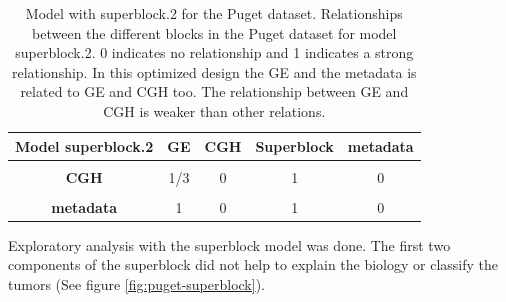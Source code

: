 \documentclass[
  12pt,
  a4paper,
  twoside,
  openright]{book}
\begin{document}
\begin{table}[H]

\caption[Model with superblock.2 for the Puget dataset.]{\label{tab:puget-model-superblock-2}Model with superblock.2 for the Puget dataset. Relationships between the different blocks in the Puget dataset for model superblock.2. 0 indicates no relationship and 1 indicates a strong relationship. In this optimized design the GE and the metadata is related to GE and CGH too. The relationship between GE and CGH is weaker than other relations.}
\centering
\begin{tabular}[t]{>{}c|c|c|c|c}
\hline
\textbf{Model superblock.2} & \textbf{GE} & \textbf{CGH} & \textbf{Superblock} & \textbf{metadata}\\
\hline
\textbf{\cellcolor{gray!6}{GE}} & \cellcolor{gray!6}{1} & \cellcolor{gray!6}{1/3} & \cellcolor{gray!6}{0} & \cellcolor{gray!6}{1}\\
\hline
\textbf{CGH} & 1/3 & 0 & 1 & 0\\
\hline
\textbf{\cellcolor{gray!6}{Superblock}} & \cellcolor{gray!6}{0} & \cellcolor{gray!6}{1} & \cellcolor{gray!6}{0} & \cellcolor{gray!6}{0}\\
\hline
\textbf{metadata} & 1 & 0 & 1 & 0\\
\hline
\end{tabular}
\end{table}

Exploratory analysis with the superblock model was done.
The first two components of the superblock did not help to explain the biology or classify the tumors (See figure \ref{fig:puget-superblock}).
\end{document}

